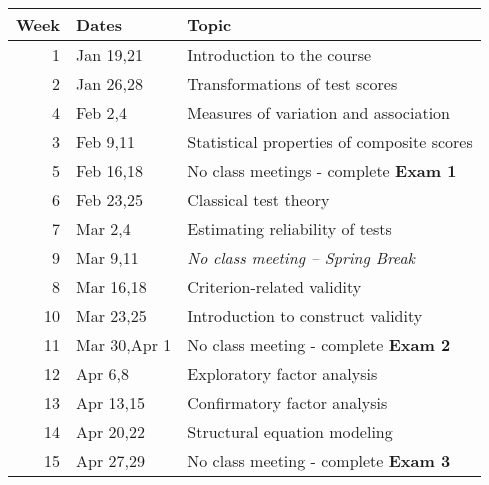 \documentclass[10pt]{article}
\begin{document}
\begin{center}
\begin{tabular}{rll}
Week & Dates & Topic\\
\hline
1 & Jan 19,21 & Introduction to the course\\
2 & Jan 26,28 & Transformations of test scores\\
4 & Feb 2,4 & Measures of variation and association\\
3 & Feb 9,11 & Statistical properties of composite scores\\
5 & Feb 16,18 & No class meetings - complete \textbf{Exam 1}\\
6 & Feb 23,25 & Classical test theory\\
7 & Mar 2,4 & Estimating reliability of tests\\
9 & Mar 9,11 & \emph{No class meeting -- Spring Break}\\
8 & Mar 16,18 & Criterion-related validity\\
10 & Mar 23,25 & Introduction to construct validity\\
11 & Mar 30,Apr 1 & No class meeting - complete \textbf{Exam 2}\\
12 & Apr 6,8 & Exploratory factor analysis\\
13 & Apr 13,15 & Confirmatory factor analysis\\
14 & Apr 20,22 & Structural equation modeling\\
15 & Apr 27,29 & No class meeting - complete \textbf{Exam 3}\\
\end{tabular}
\end{center}
\end{document}
